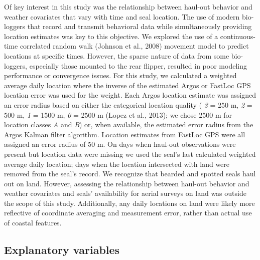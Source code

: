\documentclass[fleqn,10pt,lineno]{wlpeerj} %
\begin{document}
Of key interest in this study was the relationship between haul-out behavior and
weather covariates that vary with time and seal location. The use of modern
bio-loggers that record and transmit behavioral data while simultaneously
providing location estimates was key to this objective. We explored the use
of a continuous-time correlated random walk (Johnson et al., 2008) movement model
to predict locations at specific times. However, the sparse nature of data from
some bio-loggers, especially those mounted to the rear flipper, resulted in poor
modeling performance or convergence issues. For this study, we calculated a
weighted average daily location where the inverse of the estimated Argos or
FastLoc GPS location error was used for the weight. Each Argos location estimate
was assigned an error radius based on either the categorical location quality (
\emph{3} = 250 m, \emph{2} = 500 m, \emph{1} = 1500 m, \emph{0} = 2500 m (Lopez et al., 2013); we chose 2500 m for
location classes \emph{A} and \emph{B}) or, when available, the estimated error radius
from the Argos Kalman filter algorithm. Location estimates from FastLoc GPS were
all assigned an error radius of 50 m. On days when haul-out observations were
present but location data were missing we used the seal's last calculated weighted
average daily location; days when the location intersected with land
were removed from the seal's record. We recognize that bearded and spotted
seals haul out on land. However, assessing the relationship between haul-out
behavior and weather covariates and seals' availability for aerial surveys on
land was outside the scope of this study. Additionally, any daily locations on
land were likely more reflective of coordinate averaging and measurement error,
rather than actual use of coastal features.

\hypertarget{explanatory-variables}{%
\subsection*{Explanatory variables}\label{explanatory-variables}}
\end{document}
